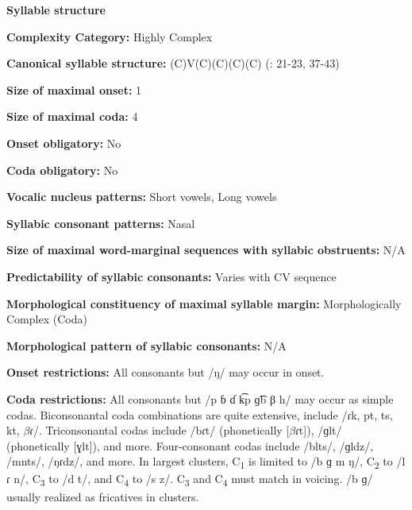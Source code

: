 \textbf{Syllable structure}



\textbf{Complexity Category:} Highly Complex



\textbf{Canonical syllable structure:} (C)V(C)(C)(C)(C) (\citealt{WieringWiering1994}: 21-23, 37-43)



\textbf{Size of maximal onset:} 1



\textbf{Size of maximal coda:} 4



\textbf{Onset obligatory:} No



\textbf{Coda obligatory:} No



\textbf{Vocalic nucleus patterns:} Short vowels, Long vowels



\textbf{Syllabic consonant patterns:} Nasal



\textbf{Size of maximal word{}-marginal sequences with syllabic obstruents:} N/A



\textbf{Predictability of syllabic consonants:} Varies with CV sequence



\textbf{Morphological constituency of maximal syllable margin:} Morphologically Complex (Coda)



\textbf{Morphological pattern of syllabic consonants:} N/A



\textbf{Onset restrictions:} All consonants but /ŋ/ may occur in onset.



\textbf{Coda restrictions:} All consonants but /p ɓ ɗ k͡p ɡ͡b β h/ may occur as simple codas. Biconsonantal coda combinations are quite extensive, include /ɾk, pt, ts, kt, $\beta ɾ$/. Triconsonantal codas include /bɾt/ (phonetically [$\beta ɾ$t]), /ɡlt/ (phonetically [ɣlt]), and more. Four-consonant codas include /blts/, /ɡldz/, /mnts/, /ŋɾdz/, and more. In largest clusters, C\textsubscript{1} is limited to /b ɡ m ŋ/, C\textsubscript{2} to /l ɾ n/, C\textsubscript{3} to /d t/, and C\textsubscript{4} to /s z/. C\textsubscript{3} and C\textsubscript{4} must match in voicing. /b ɡ/ usually realized as fricatives in clusters.



